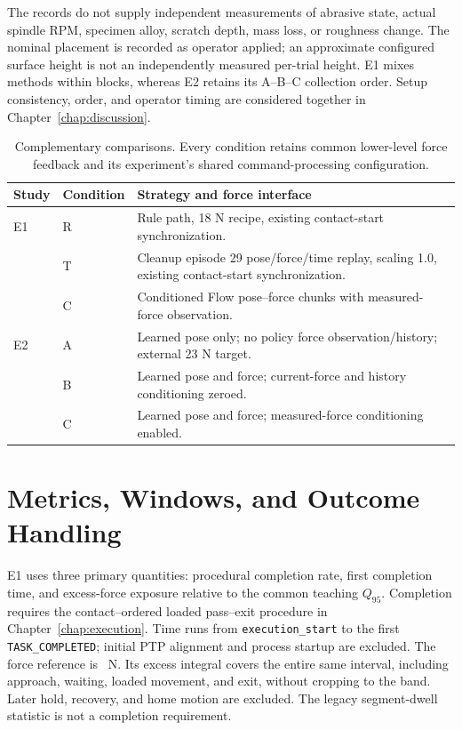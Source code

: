 The records do not supply independent measurements of abrasive state, actual spindle RPM, specimen alloy, scratch depth, mass loss, or roughness change. The nominal placement is recorded as operator applied; an approximate configured surface height is not an independently measured per-trial height. E1 mixes methods within blocks, whereas E2 retains its A--B--C collection order. Setup consistency, order, and operator timing are considered together in Chapter~\ref{chap:discussion}.

\begin{table}[tbp]\centering\small
\caption[E1/E2 comparison conditions]{Complementary comparisons. Every condition retains common lower-level force feedback and its experiment's shared command-processing configuration.}
\label{tab:expert_il_baselines}
\begin{tabularx}{\textwidth}{P{0.13\textwidth}p{0.16\textwidth}X}
\toprule Study & Condition & Strategy and force interface \\ \midrule
E1 & R & Rule path, 18 N recipe, existing contact-start synchronization. \\
 & T & Cleanup episode 29 pose/force/time replay, scaling 1.0, existing contact-start synchronization. \\
 & C & Conditioned Flow pose--force chunks with measured-force observation. \\
\midrule
E2 & A & Learned pose only; no policy force observation/history; external 23 N target. \\
 & B & Learned pose and force; current-force and history conditioning zeroed. \\
 & C & Learned pose and force; measured-force conditioning enabled. \\
\bottomrule
\end{tabularx}
\end{table}

\section{Metrics, Windows, and Outcome Handling}
E1 uses three primary quantities: procedural completion rate, first completion time, and excess-force exposure relative to the common teaching \(Q_{95}\). Completion requires the contact--ordered loaded pass--exit procedure in Chapter~\ref{chap:execution}. Time runs from \texttt{execution\_start} to the first \texttt{TASK\_COMPLETED}; initial PTP alignment and process startup are excluded. The force reference is \ForceExposureReference~N. Its excess integral covers the entire same interval, including approach, waiting, loaded movement, and exit, without cropping to the band. Later hold, recovery, and home motion are excluded. The legacy segment-dwell statistic is not a completion requirement.

